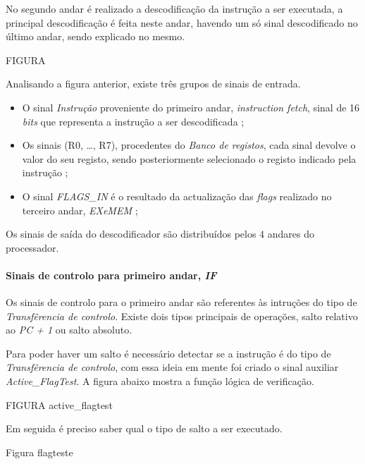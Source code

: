 \documentclass[11pt]{article}
\numberwithin{equation}{section}
\begin{document}
No segundo andar é realizado a descodificação da instrução a ser executada, a principal descodificação é feita neste andar, havendo um só sinal descodificado no último andar, sendo explicado no mesmo.

FIGURA

Analisando a figura anterior, existe três grupos de sinais de entrada.

\vspace{-2mm}

\begin{itemize}
	\item  O sinal \textit{Instrução} proveniente do primeiro andar, \textit{instruction fetch}, sinal de 16 \textit{bits} que representa a instrução a ser descodificada   ;
	\vspace{-2.5mm}
	\item Os sinais (R0, \ldots, R7), procedentes do \textit{Banco de registos}, cada sinal devolve o valor do seu registo, sendo posteriormente selecionado o registo indicado pela instrução ;
	\vspace{-2.5mm}
	\item  O sinal \textit{FLAGS\_IN} é o resultado da actualização das \textit{flags} realizado no terceiro andar, \textit{EXeMEM} ;
\end{itemize}

	Os sinais de saída do descodificador são distribuídos pelos $4$ andares do processador.
	
\paragraph{Sinais de controlo para primeiro andar, \textit{IF}}

	
	Os sinais de controlo para o primeiro andar são referentes às intruções do tipo de \textit{Transfêrencia de controlo}. Existe dois tipos principais de operações, salto relativo ao \textit{PC + 1} ou salto absoluto. 
	
	Para poder haver um salto é necessário detectar se a instrução é do tipo de \textit{Transfêrencia de controlo}, com essa ideia em mente foi criado o sinal auxiliar \textit{Active\_FlagTest}. A figura abaixo mostra a função lógica de verificação. 
	
	FIGURA active\_flagtest
	
	Em seguida é preciso saber qual o tipo de salto a ser executado. 
	
	Figura flagteste
	
\end{document}
